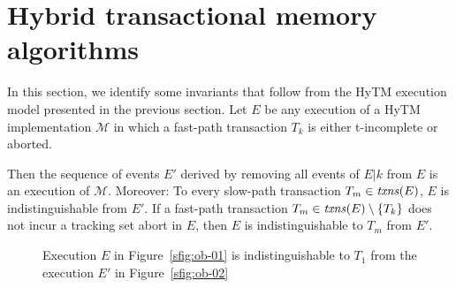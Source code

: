 \section{Hybrid transactional memory algorithms}\label{sec:hytmalgos}
%
In this section, we identify some invariants that follow from the HyTM execution model presented in the previous section.
Let $E$ be any execution of a HyTM implementation $\mathcal{M}$ in
which a fast-path transaction $T_k$ is either
t-incomplete or aborted. 
%
\begin{observation} 
\label{ob:one}
Then the sequence of events $E'$ derived by removing all events of $E|k$
from $E$ is an execution of $\mathcal{M}$. Moreover: 
To every slow-path transaction $T_m \in \ms{txns}(E)$, $E$ is indistinguishable 
from $E'$.
If a fast-path transaction $T_m\in \ms{txns}(E) \setminus \{T_k\}$ does not incur a tracking set abort in $E$, 
then $E$ is indistinguishable to $T_m$ from $E'$.

\end{observation}
%
\begin{figure*}[t]
\begin{center}
	\subfloat[\label{sfig:ob-01}]{\scalebox{0.5}[0.5]{}}
	\hspace{10mm}
	\subfloat[\label{sfig:ob-02}]{\scalebox{0.5}[0.5]{}}
	 
\end{center}
\caption{
 \label{fig:ob1}
 Execution $E$ in Figure~\ref{sfig:ob-01} is indistinguishable
to $T_1$ from the execution $E'$ in Figure~\ref{sfig:ob-02}}
\end{figure*}
%
%

%
%